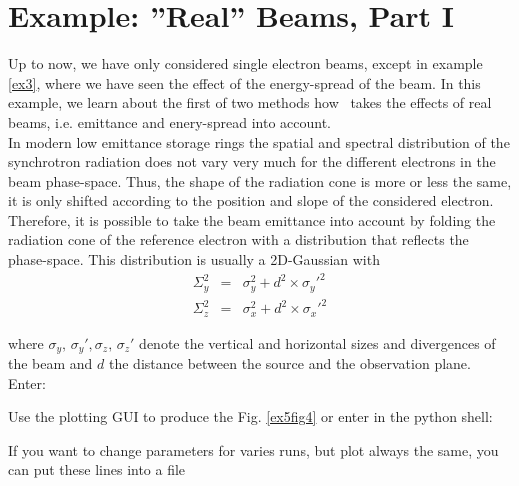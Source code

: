 \section{Example: ''Real'' Beams, Part I} \label{ex6}

Up to now, we have only considered single electron beams, except in example
\ref{ex3}, where we have seen the effect of the energy-spread of the
beam. In this example, we learn about the first of two methods how \W~takes the
effects of real beams, i.e. emittance and enery-spread into account.\\

In modern low emittance storage rings the spatial and spectral
distribution of the synchrotron radiation does not vary very much for
the different electrons in the beam phase-space. Thus, the shape of
the radiation cone is more or less the same, it is only shifted
according to the position and slope of the considered electron.
Therefore, it is possible to take the beam emittance into account by
folding the radiation cone of the reference electron with
a distribution that reflects the phase-space. This distribution is
usually a 2D-Gaussian with
\begin{eqnarray*}
\Sigma_y^2 &=& \sigma_y^2 + d^2 \times \sigma_y'^2   \\
\Sigma_z^2 &=& \sigma_x^2 + d^2 \times \sigma_x'^2
\end{eqnarray*}

where $\sigma_y,\, \sigma_y', \sigma_z, \, \sigma_z'$ denote the
vertical and horizontal sizes
and divergences of the beam  and $d$ the distance between the source and the
observation plane. Enter:\\


Use the plotting GUI to produce the Fig. \ref{ex5fig4} or enter in the
python shell:


If you want to change parameters for varies runs, but
plot always the same, you can put these lines into a file

